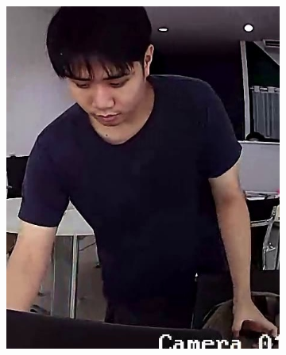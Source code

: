 \begin{figure}[!ht]
    \centering
    \begin{subfigure}[b]{0.2\textwidth}
        \centering
        \includegraphics[width=\textwidth]{chapter4/images/first_0.jpg}
        \label{fig:ex_3}
    \end{subfigure}
    \begin{subfigure}[b]{0.2\textwidth}
        \centering

\end{subfigure}
\end{figure}
